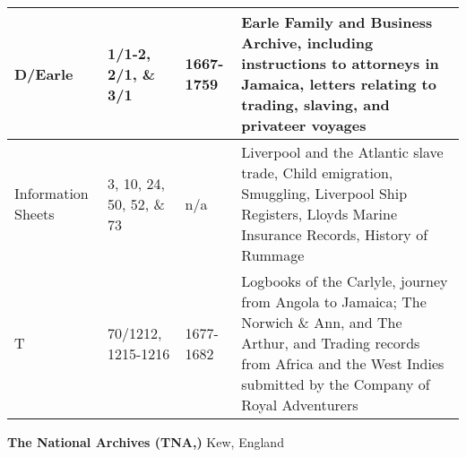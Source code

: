 \begin{flushleft}
\begin{supertabular}{|m{0.8670598in}|m{1.4830599in}|m{0.8830598in}|m{2.4629598in}|}
D/Earle &
1/1-2, 2/1, \& 3/1 &
1667-1759 &
Earle Family and Business Archive, including instructions to attorneys in Jamaica, letters relating to trading, slaving, and privateer voyages \\\hline
Information Sheets &
3, 10, 24, 50, 52, \& 73 &
n/a &
Liverpool and the Atlantic slave trade, Child emigration, Smuggling, Liverpool Ship Registers, Lloyds Marine Insurance Records, History of Rummage\\\hline
T &
70/1212, 1215-1216 &
1677-1682 &
Logbooks of the Carlyle, journey from Angola to Jamaica; The Norwich \& Ann, and The Arthur, and Trading records from Africa and the West Indies submitted by the Company of Royal Adventurers\\\hline
\end{supertabular}
\end{flushleft}
\begin{styleStandard}
\textbf{The National Archives (TNA,)} Kew, England
\end{styleStandard}

